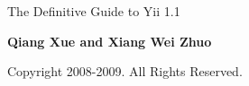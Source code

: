 
\thispagestyle{empty}
\begin{center}
    \bfseries \rule{0cm}{1.5cm} \Huge
    The Definitive Guide to Yii 1.1
     \vspace{1.5cm}
\end{center}

\begin{center}
    \bfseries \Large Qiang Xue and Xiang Wei Zhuo
\end{center}


\begin{center}
   Copyright 2008-2009. All Rights Reserved.
\end{center}

\vfill

\pagebreak \thispagestyle{empty} \cleardoublepage

